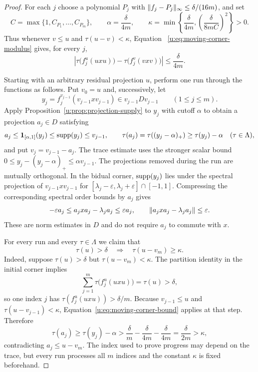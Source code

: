\begin{proof}
For each $j$ choose a polynomial $P_j$ with
$\lVert f_j-P_j\rVert_\infty\le\delta/(16m)$, and set
\[
 C=\max\{1,C_{P_1},\ldots,C_{P_m}\},
 \qquad
 \alpha=\frac{\delta}{4m},
 \qquad
 \kappa=\min\left\{\frac{\delta}{4m},
                  \left(\frac{\delta}{8mC}\right)^2\right\}>0.
\]
Thus whenever $v\le u$ and $\tau(u-v)<\kappa$, Equation~
\eqref{u:eq:moving-corner-modulus} gives, for every $j$,
\begin{equation}
\label{u:eq:moving-corner-bound}
 \left|\tau\bigl(f_j^u(uxu)\bigr)
          -\tau\bigl(f_j^v(vxv)\bigr)\right|
 \le\frac{\delta}{4m}.
\end{equation}

Starting with an arbitrary residual projection $u$, perform one run
through the functions as follows.  Put $v_0=u$ and, successively, let
\[
 y_j=f_j^{v_{j-1}}(v_{j-1}xv_{j-1})\in v_{j-1}Dv_{j-1}
 \qquad(1\le j\le m).
\]
Apply Proposition~\ref{u:prop:projection-supply} to $y_j$ with cutoff
$\alpha$ to obtain a projection $a_j\in D$ satisfying
\[
 a_j\le\mathbf 1_{[\alpha,1]}(y_j)
       \le\operatorname{supp}(y_j)\le v_{j-1},
 \qquad
 \tau(a_j)=\tau((y_j-\alpha)_+)
           \ge\tau(y_j)-\alpha
 \quad(\tau\in\Lambda),
\]
and put $v_j=v_{j-1}-a_j$.  The trace estimate uses the stronger scalar
bound $0\le y_j-(y_j-\alpha)_+\le\alpha v_{j-1}$.  The projections
removed during the run are mutually orthogonal.  In the bidual corner,
$\operatorname{supp}(y_j)$ lies under the spectral projection of $v_{j-1}xv_{j-1}$
for $[\lambda_j-\varepsilon,\lambda_j+\varepsilon]\cap[-1,1]$.
Compressing the corresponding spectral order bounds by $a_j$ gives
\[
 -\varepsilon a_j\le a_jxa_j-\lambda_ja_j
                    \le\varepsilon a_j,
 \qquad
 \lVert a_jxa_j-\lambda_ja_j\rVert\le\varepsilon.
\]
These are norm estimates in $D$ and do not require $a_j$ to commute
with $x$.

For every run and every $\tau\in\Lambda$ we claim that
\begin{equation}
\label{u:eq:scalar-run-progress}
 \tau(u)>\delta\quad\Longrightarrow\quad
 \tau(u-v_m)\ge\kappa.
\end{equation}
Indeed, suppose $\tau(u)>\delta$ but $\tau(u-v_m)<\kappa$.
The partition identity in the initial corner implies
\[
 \sum_{j=1}^m\tau\bigl(f_j^u(uxu)\bigr)=\tau(u)>\delta,
\]
so one index $j$ has $\tau(f_j^u(uxu))>\delta/m$.  Because
$v_{j-1}\le u$ and $\tau(u-v_{j-1})<\kappa$,
Equation~\eqref{u:eq:moving-corner-bound} applies at that step.  Therefore
\[
 \tau(a_j)\ge\tau(y_j)-\alpha
   >\frac{\delta}{m}-\frac{\delta}{4m}-\frac{\delta}{4m}
   =\frac{\delta}{2m}>\kappa,
\]
contradicting $a_j\le u-v_m$.  The index used to prove progress may
depend on the trace, but every run processes all $m$ indices and the
constant $\kappa$ is fixed beforehand.


\end{proof}
